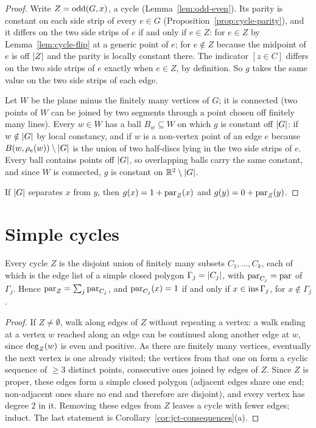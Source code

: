 \begin{proof}
Write $Z=\operatorname{odd}(G,x)$, a cycle (Lemma~\ref{lem:odd-even}). Its parity is constant on each side strip
of every $e\in G$ (Proposition~\ref{prop:cycle-parity}), and it differs on the two side strips of $e$
if and only if $e\in Z$: for $e\in Z$ by Lemma~\ref{lem:cycle-flip} at a generic point of $e$; for
$e\notin Z$ because the midpoint of $e$ is off $\lvert Z\rvert$ and the parity is locally constant there. The
indicator $[z\in C]$ differs on the two side strips of $e$ exactly when $e\in Z$, by definition. So
$g$ takes the same value on the two side strips of each edge.

Let $W$ be the plane minus the finitely many vertices of $G$; it is connected (two points of $W$
can be joined by two segments through a point chosen off finitely many lines). Every $w\in W$ has a
ball $B_w\subseteq W$ on which $g$ is constant off $\lvert G\rvert$: if $w\notin\lvert G\rvert$ by local constancy, and
if $w$ is a non-vertex point of an edge $e$ because $B(w,\rho_e(w))\setminus\lvert G\rvert$ is the union of
two half-discs lying in the two side strips of $e$. Every ball contains points off $\lvert G\rvert$, so
overlapping balls carry the same constant, and since $W$ is connected, $g$ is constant on
$\mathbb{R}^2\setminus\lvert G\rvert$.

If $\lvert G\rvert$ separates $x$ from $y$, then $g(x)=1+\operatorname{par}_Z(x)$ and $g(y)=0+\operatorname{par}_Z(y)$.
\end{proof}


\section{Simple cycles}

\begin{proposition}\label{prop:simple-cycles}
Every cycle $Z$ is the disjoint union of finitely many subsets $C_1,\dots,C_k$, each of which is
the edge list of a simple closed polygon $\Gamma_j=\lvert C_j\rvert$, with $\operatorname{par}_{C_j}=\operatorname{par}$ of
$\Gamma_j$. Hence $\operatorname{par}_Z=\sum_j\operatorname{par}_{C_j}$, and $\operatorname{par}_{C_j}(x)=1$ if and only if
$x\in\operatorname{ins}\Gamma_j$, for $x\notin\Gamma_j$.
\end{proposition}

\begin{proof}
If $Z\neq\emptyset$, walk along edges of $Z$ without repeating a vertex: a walk ending at a vertex
$w$ reached along an edge can be continued along another edge at $w$, since $\operatorname{deg}_Z(w)$ is even and
positive. As there are finitely many vertices, eventually the next vertex is one already visited;
the vertices from that one on form a cyclic sequence of $\ge3$ distinct points, consecutive ones
joined by edges of $Z$. Since $Z$ is proper, these edges form a simple closed polygon (adjacent edges
share one end; non-adjacent ones share no end and therefore are disjoint), and every vertex has
degree $2$ in it. Removing these edges from $Z$ leaves a cycle with fewer edges; induct. The last
statement is Corollary~\ref{cor:jct-consequences}(a).
\end{proof}

